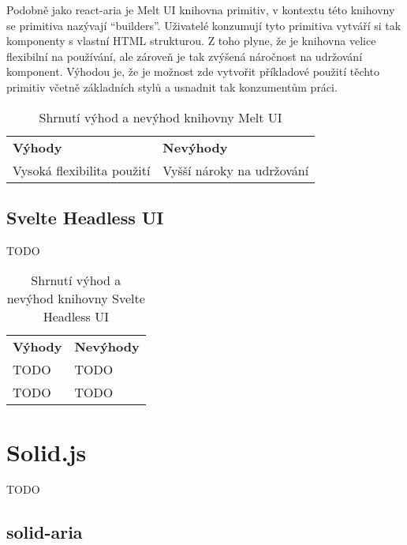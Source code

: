 Podobně jako react-aria je Melt UI knihovna primitiv, v kontextu této knihovny se primitiva nazývají ``builders''.
Uživatelé konzumují tyto primitiva vytváří si tak komponenty s vlastní HTML strukturou.
Z toho plyne, že je knihovna velice flexibilní na používání, ale zároveň je tak zvýšená náročnost na udržování komponent.
Výhodou je, že je možnost zde vytvořit příkladové použití těchto primitiv včetně základních stylů a usnadnit tak konzumentům práci.

\begin{table}[ht]
    \begin{ctucolortab}
        \begin{tabularx}{\textwidth}{Y Y}
            \bfseries \textcolor{OK}{Výhody} & \bfseries \textcolor{NOT_OK}{Nevýhody} \\\Midrule{}
            Vysoká flexibilita použití       & Vyšší nároky na udržování
        \end{tabularx}
    \end{ctucolortab}
    \caption{Shrnutí výhod a nevýhod knihovny Melt UI}
\end{table}

\subsection{Svelte Headless UI}

TODO

\begin{table}[ht]
    \begin{ctucolortab}
        \begin{tabularx}{\textwidth}{Y Y}
            \bfseries \textcolor{OK}{Výhody} & \bfseries \textcolor{NOT_OK}{Nevýhody} \\\Midrule{}
            TODO                             & TODO                                   \\
            TODO                             & TODO
        \end{tabularx}
    \end{ctucolortab}
    \caption{Shrnutí výhod a nevýhod knihovny Svelte Headless UI}
\end{table}

\section{Solid.js}

TODO

\subsection{solid-aria}
